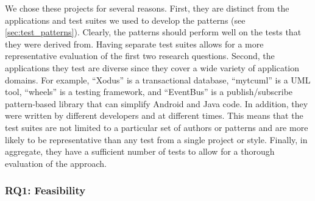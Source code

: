 We chose these projects for several reasons.
%
First, they are distinct from the applications and test suites we used to develop the patterns (see \cref{sec:test_patterns}).
%
Clearly, the patterns should perform well on the tests that they were derived from.
%
Having separate test suites allows for a more representative evaluation of the first two research questions.
%
Second, the applications they test are diverse since they cover a wide variety of application domains.
%
For example, \enquote{Xodus} is a transactional database, \enquote{mytcuml} is a UML tool, \enquote{wheels} is a testing framework, and \enquote{EventBus} is a publish\slash subscribe pattern-based library that can simplify Android and Java code.
%
In addition, they were written by different developers and at different times.
%
This means that the test suites are not limited to a particular set of authors or patterns and are more likely to be representative than any test from a single project or style.
%
Finally, in aggregate, they have a sufficient number of tests to allow for a thorough evaluation of the approach.


\subsubsection{RQ1: Feasibility}
\label{sec:evaluation:feasibility}

